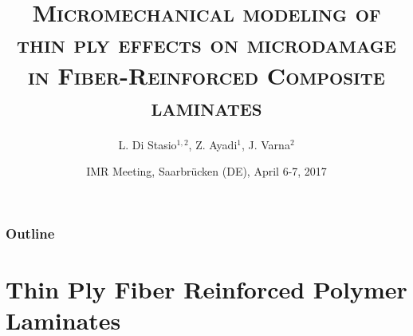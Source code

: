 \documentclass[first,firstsupp,lastsupp,handout,last,hyperref,table]{ETHclass}
\makeatletter
\newenvironment{withoutheadline}{
         \setbeamertemplate{headline}{%
\vspace{35pt}
}
    }{}
\makeatother
\begin{document}

\title[\textsc{Modeling of thin ply effects on microdamage}]{\textsc{Micromechanical modeling of thin ply effects on microdamage in Fiber-Reinforced Composite laminates}}
\author{ L. Di Stasio$^{1,2}$, Z. Ayadi$^{1}$, J. Varna$^{2}$}
\date{IMR Meeting, Saarbr\"ucken (DE), April 6-7, 2017}

\begin{frame}[plain]
    \titlepage
\end{frame}

\begin{withoutheadline}
\begin{frame}
\frametitle{Outline}
\justifying
\vspace*{-0.5cm}
\tableofcontents[hidesubsections]
\end{frame}
\end{withoutheadline}



\section[Thin Ply FRP Laminates]{Thin Ply Fiber Reinforced Polymer Laminates}
\end{document}
